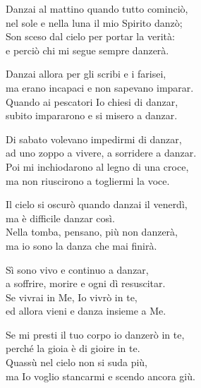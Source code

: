

\spazio

\strofa Danzai al mattino quando tutto cominciò,\\
nel sole e nella luna il mio Spirito danzò;\\
Son sceso dal cielo per portar la verità:\\
e perciò chi mi segue sempre danzerà.

\spazio


\spazio

\strofa Danzai allora per gli scribi e i farisei,\\
ma erano incapaci e non sapevano imparar.\\
Quando ai pescatori Io chiesi di danzar,\\
subito impararono e si misero a danzar.

\spazio


\spazio

\strofa Di sabato volevano impedirmi di danzar,\\
ad uno zoppo a vivere, a sorridere a danzar.\\
Poi mi inchiodarono al legno di una croce,\\
ma non riuscirono a togliermi la voce.

\spazio


\spazio

\strofa Il cielo si oscurò quando danzai il venerdì,\\
ma è difficile danzar così.\\
Nella tomba, pensano, più non danzerà,\\
ma io sono la danza che mai finirà.

\spazio


\spazio

\strofa Sì sono vivo e continuo a danzar,\\
a soffrire, morire e ogni dì resuscitar.\\
Se vivrai in Me, Io vivrò in te,\\
ed allora vieni e danza insieme a Me.

\spazio


\spazio

\strofa Se mi presti il tuo corpo io danzerò in te,\\
perché la gioia è di gioire in te.\\
Quassù nel cielo non si suda più,\\
ma Io voglio stancarmi e scendo ancora giù.

\spazio

